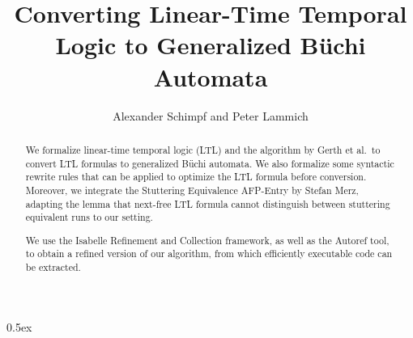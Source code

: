 \documentclass[11pt,a4paper]{article}
\begin{document}
\title{Converting Linear-Time Temporal Logic to Generalized B\"uchi Automata}
\author{Alexander Schimpf and Peter Lammich}
\maketitle

\begin{abstract}
We formalize linear-time temporal logic (LTL) and the algorithm by Gerth et al.\ to convert LTL formulas to generalized B\"uchi automata.
We also formalize some syntactic rewrite rules that can be applied to optimize the LTL formula before conversion.
Moreover, we integrate the Stuttering Equivalence AFP-Entry by Stefan Merz, adapting the lemma that next-free LTL formula cannot distinguish between
stuttering equivalent runs to our setting.

We use the Isabelle Refinement and Collection framework, as well as the Autoref tool, to obtain a refined version of our algorithm,
from which efficiently executable code can be extracted.
\end{abstract}

\clearpage

\tableofcontents
\clearpage

\parindent 0pt\parskip 0.5ex







\end{document}
